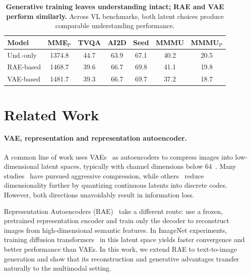 \documentclass[10pt,twocolumn,letterpaper]{article}
\begin{document}
\begin{table}[t]
    \centering
    \footnotesize
    \setlength{\tabcolsep}{4.2pt}  %
    \caption{
\textbf{Generative training leaves understanding intact; RAE and VAE perform similarly.}
Across VL benchmarks, both latent choices produce comparable understanding performance.
}\label{tab:vl_eval}
    \begin{tabular}{lcccccc}
        \toprule
        \textbf{Model} & 
        \textbf{MME$_{\text{P}}$} &
        \textbf{TVQA} &
        \textbf{AI2D} &
        \textbf{Seed} &
        \textbf{MMMU} &
        \textbf{MMMU$_{\text{P}}$} \\
        \midrule
        Und.-only  &  1374.8 &  44.7 & 63.9 & 67.1 & 40.2 & 20.5 \\
        RAE-based  &  1468.7 &  39.6 & 66.7 & 69.8 & 41.1 & 19.8 \\
        VAE-based  &  1481.7 &  39.3 & 66.7 & 69.7 & 37.2 & 18.7 \\
        \bottomrule
    \end{tabular}
\end{table}


\section{Related Work}

\paragraph{VAE, representation and representation autoencoder.}

A common line of work uses VAEs~\citep{VAE} as autoencoders to compress images into low-dimensional latent spaces, typically with channel dimensions below 64~\citep{flux, SD3}. 
Many studies~\citep{dcae,titok} have pursued aggressive compression, while others~\citep{vqvae,vqvae2} reduce dimensionality further by quantizing continuous latents into discrete codes. However, both directions unavoidably result in information loss. 


Representation Autoencoders (RAE)~\citep{zheng2025diffusion} take a different route: use a frozen, pretrained representation encoder and train only the decoder to reconstruct images from high-dimensional semantic features. 
In ImageNet experiments, training diffusion transformers~\citep{dit} in this latent space yields faster convergence and better performance than VAEs. In this work, we extend RAE to text-to-image generation and show that its reconstruction and generative advantages transfer naturally to the multimodal setting. 
\end{document}
